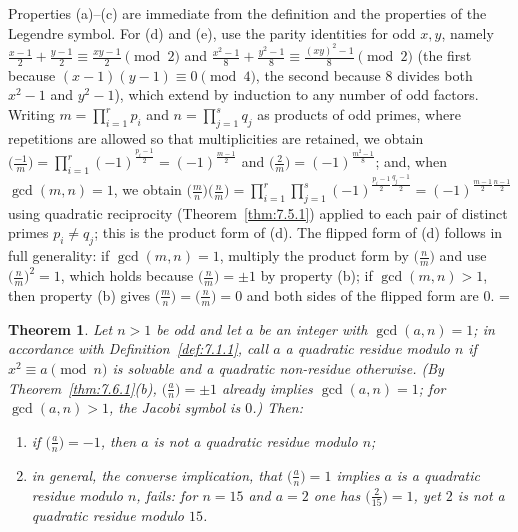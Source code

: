 \documentclass[11pt]{article}
\makeatletter
\theoremstyle{ntstyle}
\newtheorem{theorem}{Theorem}[subsection]
\let\nt@closedisplay\]
\def\nt@guardedclose{\@ifnextchar\par{\nt@closeafterpar}{\@ifnextchar\end{\postdisplaypenalty\@M\nt@closedisplay}{\nt@closedisplay}}}
\def\nt@closeafterpar\par{\@ifnextchar\par{\nt@closeafterpar}{\@ifnextchar\end{\postdisplaypenalty\@M\nt@closedisplay\par}{\nt@closedisplay\par}}}
\renewenvironment{proof}[1][\proofname]{\par
  \pushQED{\qed}\normalfont\topsep\medskipamount\edef\nt@afterproof{\@endparpenalty=\the\@endparpenalty\relax}\@beginparpenalty\@M\@endparpenalty\@M\let\]\nt@guardedclose\trivlist\item[]\textit{#1\@addpunct{.}} \ignorespaces}{\ifvmode\addpenalty\@M\fi\popQED\nt@afterproof\endtrivlist\@endpefalse}
\newcommand{\legs}[2]{\bigl(\tfrac{#1}{#2}\bigr)}
\makeatother
\begin{document}
\begin{proof} Properties (a)--(c) are immediate from the
	definition and the properties of the Legendre symbol. For (d) and (e), use the parity identities for
	odd $x, y$, namely $\frac{x-1}{2} + \frac{y-1}{2}
		\equiv \frac{xy-1}{2} \pmod{2}$ and $\frac{x^2-1}{8} + \frac{y^2-1}{8}
		\equiv \frac{(xy)^2-1}{8} \pmod{2}$ (the first because $(x-1)(y-1)
		\equiv 0 \pmod{4}$, the second because $8$ divides both $x^2-1$ and $y^2-1$), which
	extend by induction to any number of odd factors. Writing $m=\prod_{i=1}^{r}p_i$ and
	$n=\prod_{j=1}^{s}q_j$ as products of odd primes, where repetitions
	are allowed so that multiplicities are retained, we obtain
	$\legs{-1}{m}=\prod_{i=1}^{r} (-1)^{\frac{p_i-1}{2}} =
		(-1)^{\frac{m-1}{2}}$ and $\legs{2}{m} =
		(-1)^{\frac{m^2-1}{8}}$; and, when $\gcd(m, n) = 1$, we obtain
		$\legs{m}{n}\legs{n}{m}=\prod_{i=1}^{r}\prod_{j=1}^{s}(-1)^{\frac{p_i-1}{2}\frac{q_j-1}{2}} =
		(-1)^{\frac{m-1}{2}\frac{n-1}{2}}$ using quadratic reciprocity (Theorem~\ref{thm:7.5.1}) applied
		to each pair of distinct primes $p_i \neq q_j$; this is
	the product form of (d). The flipped form of (d) follows in
	full generality: if $\gcd(m, n) = 1$, multiply the product form by
	$\legs{n}{m}$ and use $\legs{n}{m}^{2} = 1$, which holds because
	$\legs{n}{m} = \pm 1$ by property (b); if $\gcd(m, n) > 1$, then property (b)
	gives $\legs{m}{n} = \legs{n}{m} = 0$ and both sides of the flipped form
	are $0$.
\end{proof}
\begin{theorem}\label{thm:7.6.2} Let $n > 1$ be odd and let $a$ be an integer with
	$\gcd(a, n) = 1$; in accordance with Definition~\ref{def:7.1.1}, call $a$ a
	quadratic residue modulo $n$ if $x^{2} \equiv a \pmod{n}$ is solvable
	and a quadratic non-residue otherwise. (By
	Theorem~\ref{thm:7.6.1}(b), $\legs{a}{n}=\pm1$ already implies
	$\gcd(a,n)=1$; for $\gcd(a,n)>1$, the Jacobi symbol is $0$.) Then:

	\begin{enumerate}[label={\alph*)}]
		\item if $\legs{a}{n} = -1$, then $a$ is not a quadratic residue modulo
					$n$;
		\item in general, the converse implication, that $\legs{a}{n}=1$ implies $a$ is a quadratic
		residue modulo $n$, fails: for $n = 15$ and $a = 2$ one has
					$\legs{2}{15} = 1$, yet $2$ is not a quadratic residue modulo $15$.
	\end{enumerate}
\end{theorem}
\end{document}

